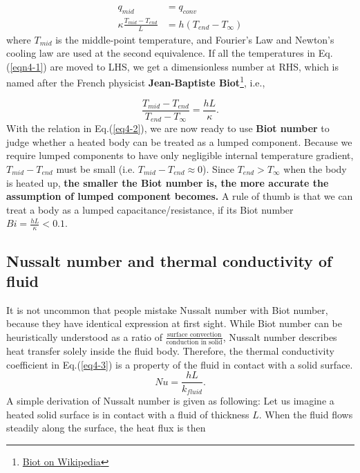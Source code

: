 \begin{equation}
\begin{aligned}
    q_{mid}&=q_{conv}\\
    \kappa\frac{T_{mid}-T_{end}}{L}&=h(T_{end}-T_{\infty})
\end{aligned}
\label{eqn4-1}
\end{equation}
where $T_{mid}$ is the middle-point temperature, and Fourier's Law and Newton's cooling law are used at the second equivalence. If all the temperatures in Eq.(\ref{eqn4-1}) are moved to LHS, we get a dimensionless number at RHS, which is named after the French physicist \textbf{Jean-Baptiste Biot}\footnote{\href{https://en.wikipedia.org/wiki/Jean-Baptiste_Biot}{Biot on Wikipedia}}, i.e.,

\begin{equation}
    \frac{T_{mid}-T_{end}}{T_{end}-T_{\infty}}=\frac{hL}{\kappa}.
    \label{eq4-2}
\end{equation}
With the relation in Eq.(\ref{eq4-2}), we are now ready to use \textbf{Biot number} to judge whether a heated body can be treated as a lumped component. Because we require lumped components to have only negligible internal temperature gradient, $T_{mid}-T_{end}$ must be small (i.e. $T_{mid}-T_{end}\approx0$). Since $T_{end}>T_{\infty}$ when the body is heated up, \textbf{the smaller the Biot number is, the more accurate the assumption of lumped component becomes.} A rule of thumb is that we can treat a body as a lumped capacitance/resistance, if its Biot number $Bi=\frac{hL}{\kappa}<0.1$.

\subsection{Nussalt number and thermal conductivity of fluid}
It is not uncommon that people mistake Nussalt number with Biot number, because they have identical expression at first sight. While Biot number can be heuristically understood as a ratio of $\frac{\text{surface convection}}{\text{conduction in solid}}$, Nussalt number describes heat transfer solely inside the fluid body. Therefore, the thermal conductivity coefficient in Eq.(\ref{eq4-3}) is a property of the fluid in contact with a solid surface.
\begin{equation}
    Nu=\frac{hL}{k_{fluid}}.
    \label{eq4-3}
\end{equation}
A simple derivation of Nussalt number is given as following: Let us imagine a heated solid surface is in contact with a fluid of thickness $L$. When the fluid flows steadily along the surface, the heat flux is then 

